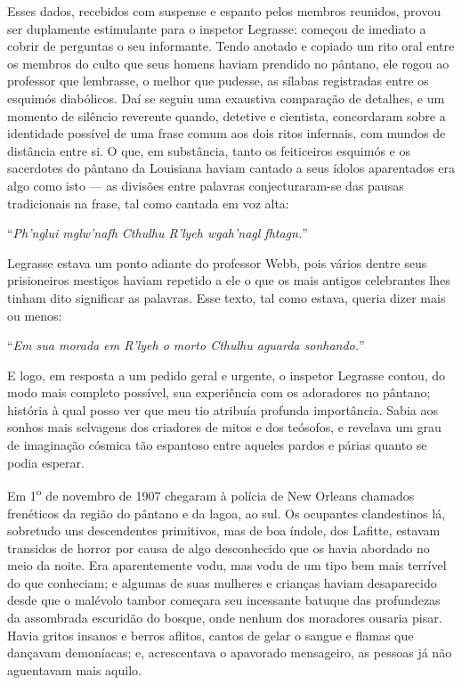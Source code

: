 Esses dados, recebidos com suspense e espanto pelos membros reunidos,
provou ser duplamente estimulante para o inspetor Legrasse: começou de
imediato a cobrir de perguntas o seu informante. Tendo anotado e copiado
um rito oral entre os membros do culto que seus homens haviam prendido
no pântano, ele rogou ao professor que lembrasse, o melhor que pudesse,
as sílabas registradas entre os esquimós diabólicos. Daí se seguiu uma
exaustiva comparação de detalhes, e um momento de silêncio reverente
quando, detetive e cientista, concordaram sobre a identidade possível de
uma frase comum aos dois ritos infernais, com mundos de distância entre
si. O que, em substância, tanto os feiticeiros esquimós e os sacerdotes
do pântano da Louisiana haviam cantado a seus ídolos aparentados era
algo como isto --- as divisões entre palavras conjecturaram-se das
pausas tradicionais na frase, tal como cantada em voz alta:

``\emph{Ph'nglui mglw'nafh Cthulhu R'lyeh wgah'nagl fhtagn.}''

Legrasse estava um ponto adiante do professor Webb, pois vários dentre
seus prisioneiros mestiços haviam repetido a ele o que os mais antigos
celebrantes lhes tinham dito significar as palavras. Esse texto, tal
como estava, queria dizer mais ou menos:

``\emph{Em sua morada em R'lyeh o morto Cthulhu aguarda sonhando.}''

E logo, em resposta a um pedido geral e urgente, o inspetor Legrasse
contou, do modo mais completo possível, sua experiência com os
adoradores no pântano; história à qual posso ver que meu tio atribuía
profunda importância. Sabia aos sonhos mais selvagens dos criadores de
mitos e dos teósofos, e revelava um grau de imaginação cósmica tão
espantoso entre aqueles pardos e párias quanto se podia esperar.

Em 1\textsuperscript{o} de novembro de 1907 chegaram à polícia de
New Orleans chamados frenéticos da região do pântano e da lagoa, ao sul.
Os ocupantes clandestinos lá, sobretudo uns descendentes primitivos, mas
de boa índole, dos Lafitte,
estavam transidos de horror por causa de algo desconhecido que os havia
abordado no meio da noite. Era aparentemente vodu, mas vodu de um tipo
bem mais terrível do que conheciam; e algumas de suas mulheres e
crianças haviam desaparecido desde que o malévolo tambor começara seu
incessante batuque das profundezas da assombrada escuridão do bosque,
onde nenhum dos moradores ousaria pisar. Havia gritos insanos e berros
aflitos, cantos de gelar o sangue e flamas que dançavam demoníacas; e,
acrescentava o apavorado mensageiro, as pessoas já não aguentavam mais
aquilo.

